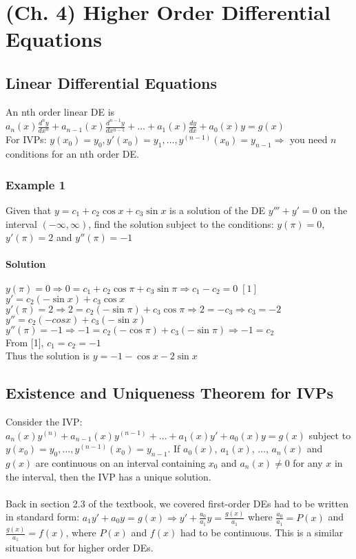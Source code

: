 \documentclass{article}
\begin{document}
\section{(Ch. 4) Higher Order Differential Equations}

\subsection{Linear Differential Equations}
An nth order linear DE is $a_n(x)\frac{d^ny}{dx^n}+a_{n-1}(x)\frac{d^{n-1}y}{dx^{n-1}}+\dots+a_1(x)\frac{dy}{dx}+a_0(x)y=g(x)$
\\For IVPs: $y(x_0)=y_0, y'(x_0)=y_1,\dots,y^{(n-1)}(x_0)=y_{n-1}\Rightarrow$ you need $n$ conditions for an nth order DE.

\subsubsection{Example 1}
Given that $y=c_1+c_2\cos{x}+c_3\sin{x}$ is a solution of the DE $y'''+y'=0$ on the interval $(-\infty, \infty)$,
find the solution subject to the conditions: $y(\pi)=0$, $y'(\pi)=2$ and $y''(\pi)=-1$

\paragraph{Solution} $y(\pi)=0\Rightarrow0=c_1+c_2\cos\pi+c_3\sin\pi\Rightarrow c_1-c_2=0\;[1]$
\\$y'=c_2(-\sin{x})+c_3\cos{x}$
\\$y'(\pi)=2\Rightarrow2=c_2(-\sin\pi)+c_3\cos\pi\Rightarrow2=-c_3\Rightarrow c_3=-2$
\\$y''=c_2(-cos{x})+c_3(-\sin{x})$
\\$y''(\pi)=-1\Rightarrow-1=c_2(-\cos\pi)+c_3(-\sin\pi)\Rightarrow -1=c_2$
\\From [1], $c_1=c_2=-1$
\\Thus the solution is $y=-1-\cos{x}-2\sin{x}$

\subsection{Existence and Uniqueness Theorem for IVPs}
Consider the IVP: $a_n(x)y^{(n)}+a_{n-1}(x)y^{(n-1)}+\dots+a_1(x)y'+a_0(x)y=g(x)$ subject to $y(x_0)=y_0,\dots,y^{(n-1)}(x_0)=y_{n-1}$.
If $a_0(x)$, $a_1(x)$, $\dots$, $a_n(x)$ and $g(x)$ are continuous on an interval containing $x_0$ and $a_n(x)\neq0$ for any $x$ in the interval,
then the IVP has a unique solution.
\\\\Back in section 2.3 of the textbook, we covered first-order DEs had to be written in standard form: $a_1y'+a_0y=g(x)\Rightarrow y'+\frac{a_0}{a_1}y=\frac{g(x)}{a_1}$
where $\frac{a_0}{a_1}=P(x)$ and $\frac{g(x)}{a_1}=f(x)$, where $P(x)$ and $f(x)$ had to be continuous. This is a similar situation but for higher order DEs.
\end{document}
